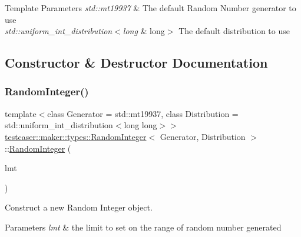 \begin{DoxyTemplParams}{Template Parameters}
{\em std\+::mt19937} & The default Random Number generator to use \\
\hline
{\em std\+::uniform\+\_\+int\+\_\+distribution$<$long} & long$>$ The default distribution to use \\
\hline
\end{DoxyTemplParams}


\subsection{Constructor \& Destructor Documentation}
\mbox{\label{classtestcaser_1_1maker_1_1types_1_1RandomInteger_a026bc0b7613813494afce8066fb997ea}} 
\subsubsection{\texorpdfstring{Random\+Integer()}{RandomInteger()}\hspace{0.1cm}{\footnotesize\ttfamily [1/2]}}
{\footnotesize\ttfamily template$<$class Generator = std\+::mt19937, class Distribution = std\+::uniform\+\_\+int\+\_\+distribution$<$long long$>$$>$ \\
\hyperlink{classtestcaser_1_1maker_1_1types_1_1RandomInteger}{testcaser\+::maker\+::types\+::\+Random\+Integer}$<$ Generator, Distribution $>$\+::\hyperlink{classtestcaser_1_1maker_1_1types_1_1RandomInteger}{Random\+Integer} (\begin{DoxyParamCaption}\item[{\hyperlink{classtestcaser_1_1maker_1_1RandomIntegerLimit}{testcaser\+::maker\+::\+Random\+Integer\+Limit}}]{lmt }\end{DoxyParamCaption})\hspace{0.3cm}{\ttfamily [inline]}}



Construct a new Random Integer object. 


\begin{DoxyParams}{Parameters}
{\em lmt} & the limit to set on the range of random number generated \\
\hline
\end{DoxyParams}
\mbox{\label{classtestcaser_1_1maker_1_1types_1_1RandomInteger_ae126be1bc8d04520b063924e57ccedc6}} 
